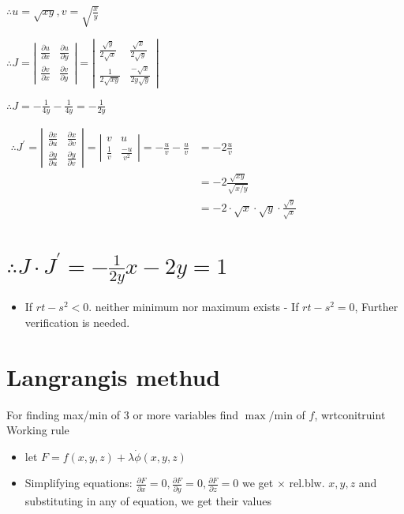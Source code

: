 \documentclass[12pt, a4paper]{article}
\begin{document}
$\therefore u=\sqrt{x y}, v=\sqrt{\frac{x}{y}}$

$\therefore J=\left|\begin{array}{ll}\frac{\partial u}{\partial x} & \frac{\partial u}{\partial y} \\ \frac{\partial v}{\partial x} & \frac{\partial v}{\partial y}\end{array}\right|=\left|\begin{array}{cc}\frac{\sqrt{y}}{2 \sqrt{x}} & \frac{\sqrt{x}}{2 \sqrt{y}} \\ \frac{1}{2 \sqrt{x y}} & \frac{-\sqrt{x}}{2 y \sqrt{y}}\end{array}\right|$

$\therefore J=-\frac{1}{4 y}-\frac{1}{4 y}=-\frac{1}{2 y}$

$\begin{aligned} \therefore J^{\prime}=\left|\begin{array}{ll}\frac{\partial x}{\partial u} & \frac{\partial x}{\partial v} \\ \frac{\partial y}{\partial u} & \frac{\partial y}{\partial v}\end{array}\right|=\left|\begin{array}{cc}v & u \\ \frac{1}{v} & \frac{-u}{v^{2}}\end{array}\right|=-\frac{u}{v}-\frac{u}{v} & =-2 \frac{u}{v} \\ & =-2 \frac{\sqrt{x y}}{\sqrt{x / y}} \\ & =-2 \cdot \sqrt{x} \cdot \sqrt{y} \cdot \frac{\sqrt{y}}{\sqrt{x}}\end{aligned}$

\section*{$\therefore J \cdot J^{\prime}=-\frac{1}{2 y} x-2 y=1$}
\begin{itemize}
  \item If $r t-s^{2}<0$. neither minimum nor maximum exists - If $r t-s^{2}=0$, Further verification is needed.
\end{itemize}

\section*{Langrangis methud}
For finding max/min of 3 or more variables find $\max / \mathrm{min}$ of $f$, wrtconitruint Working rule

\begin{itemize}
  \item let $F=f(x, y, z)+\lambda \dot{\phi}(x, y, z)$
  \item Simplifying equations: $\frac{\partial F}{\partial x}=0, \frac{\partial F}{\partial y}=0, \frac{\partial F}{\partial z}=0$ we get $\times$ rel.blw. $x, y, z$ and substituting in any of equation, we get their values
\end{itemize}
\end{document}
